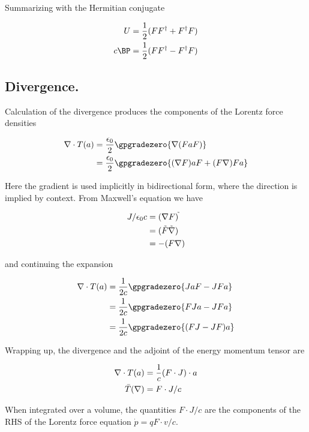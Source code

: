 Summarizing with the Hermitian conjugate

\begin{align}
U &= \frac{1}{2}( F F^\dagger + F^\dagger F) \\
c \BP &= \frac{1}{2}( F F^\dagger - F^\dagger F)
\end{align}

\subsection{ Divergence. }

Calculation of the divergence produces the components of the Lorentz force densities

\begin{align*}
\grad \cdot T(a)
&= \frac{\epsilon_0}{2} \gpgradezero{ \grad (F a F) } \\
&= \frac{\epsilon_0}{2} \gpgradezero{ (\grad F) a F + (F \grad) F a } \\
\end{align*}

Here the gradient is used implicitly in bidirectional form, where the direction is implied by context.
From Maxwell's equation we have

\begin{align*}
J/\epsilon_0 c
&= (\nabla F)^{\tilde{}} \\
&= (\tilde{F} \tilde{\nabla}) \\
&= -(F \nabla)
\end{align*}

and continuing the expansion

\begin{align*}
\grad \cdot T(a)
&= \frac{1}{2c} \gpgradezero{ J a F - J F a } \\
&= \frac{1}{2c} \gpgradezero{ F J a - J F a } \\
&= \frac{1}{2c} \gpgradezero{ (F J - J F) a } \\
\end{align*}

Wrapping up, the divergence and the adjoint of the energy momentum tensor are

\begin{align}
\nabla \cdot T(a) &= \frac{1}{c} (F \cdot J) \cdot a \\
\bar{T}(\nabla) &= F \cdot J/c
\end{align}

When integrated over a volume, the quantities $F \cdot J/c$ are the components of the RHS of the Lorentz
force equation $\dot{p} = q F \cdot v/c$.

\EndArticle
